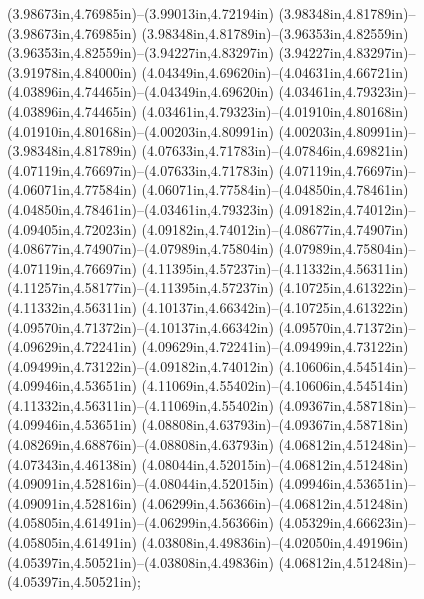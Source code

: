 (3.98673in,4.76985in)--(3.99013in,4.72194in) (3.98348in,4.81789in)--(3.98673in,4.76985in) (3.98348in,4.81789in)--(3.96353in,4.82559in) (3.96353in,4.82559in)--(3.94227in,4.83297in) (3.94227in,4.83297in)--(3.91978in,4.84000in) (4.04349in,4.69620in)--(4.04631in,4.66721in) (4.03896in,4.74465in)--(4.04349in,4.69620in) (4.03461in,4.79323in)--(4.03896in,4.74465in) (4.03461in,4.79323in)--(4.01910in,4.80168in) (4.01910in,4.80168in)--(4.00203in,4.80991in) (4.00203in,4.80991in)--(3.98348in,4.81789in) (4.07633in,4.71783in)--(4.07846in,4.69821in) (4.07119in,4.76697in)--(4.07633in,4.71783in) (4.07119in,4.76697in)--(4.06071in,4.77584in) (4.06071in,4.77584in)--(4.04850in,4.78461in) (4.04850in,4.78461in)--(4.03461in,4.79323in) (4.09182in,4.74012in)--(4.09405in,4.72023in) (4.09182in,4.74012in)--(4.08677in,4.74907in) (4.08677in,4.74907in)--(4.07989in,4.75804in) (4.07989in,4.75804in)--(4.07119in,4.76697in) (4.11395in,4.57237in)--(4.11332in,4.56311in) (4.11257in,4.58177in)--(4.11395in,4.57237in) (4.10725in,4.61322in)--(4.11332in,4.56311in) (4.10137in,4.66342in)--(4.10725in,4.61322in) (4.09570in,4.71372in)--(4.10137in,4.66342in) (4.09570in,4.71372in)--(4.09629in,4.72241in) (4.09629in,4.72241in)--(4.09499in,4.73122in) (4.09499in,4.73122in)--(4.09182in,4.74012in) (4.10606in,4.54514in)--(4.09946in,4.53651in) (4.11069in,4.55402in)--(4.10606in,4.54514in) (4.11332in,4.56311in)--(4.11069in,4.55402in) (4.09367in,4.58718in)--(4.09946in,4.53651in) (4.08808in,4.63793in)--(4.09367in,4.58718in) (4.08269in,4.68876in)--(4.08808in,4.63793in) (4.06812in,4.51248in)--(4.07343in,4.46138in) (4.08044in,4.52015in)--(4.06812in,4.51248in) (4.09091in,4.52816in)--(4.08044in,4.52015in) (4.09946in,4.53651in)--(4.09091in,4.52816in) (4.06299in,4.56366in)--(4.06812in,4.51248in) (4.05805in,4.61491in)--(4.06299in,4.56366in) (4.05329in,4.66623in)--(4.05805in,4.61491in) (4.03808in,4.49836in)--(4.02050in,4.49196in) (4.05397in,4.50521in)--(4.03808in,4.49836in) (4.06812in,4.51248in)--(4.05397in,4.50521in);
